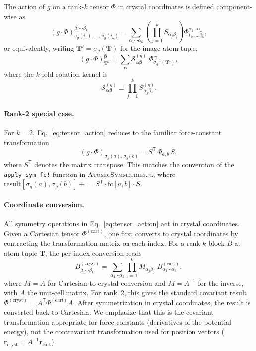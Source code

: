 \documentclass[twocolumn,amsmath,amssymb,aps,prb,10pt,floatfix]{revtex4-2}
\newcommand{\vT}{\mathbf{T}}
\newcommand{\valpha}{\boldsymbol{\alpha}}
\newcommand{\vbeta}{\boldsymbol{\beta}}
\begin{document}
The action of $g$ on a rank-$k$ tensor $\Phi$ in crystal coordinates is defined component-wise as
\begin{equation}
(g \cdot \Phi)^{\beta_1 \cdots \beta_k}_{\sigma_g(i_1),\, \dots,\, \sigma_g(i_k)}
= \sum_{\alpha_1 \cdots \alpha_k}
  \left( \prod_{j=1}^{k} S_{\alpha_j \beta_j} \right)
  \Phi^{\alpha_1 \cdots \alpha_k}_{i_1, \dots, i_k},
\label{eq:tensor_action}
\end{equation}
or equivalently, writing $\vT' = \sigma_g(\vT)$ for the image atom tuple,
\begin{equation}
(g \cdot \Phi)^{\vbeta}_{\vT'}
= \sum_{\valpha} \mathcal{S}^{(g)}_{\valpha \vbeta}\;
  \Phi^{\valpha}_{\sigma_g^{-1}(\vT')},
\label{eq:tensor_action_compact}
\end{equation}
where the $k$-fold rotation kernel is
\begin{equation}
\mathcal{S}^{(g)}_{\valpha \vbeta}
\equiv \prod_{j=1}^{k} S^{(g)}_{\alpha_j \beta_j}.
\label{eq:rotation_kernel}
\end{equation}

\paragraph{Rank-2 special case.}
For $k=2$, Eq.~\eqref{eq:tensor_action} reduces to the familiar force-constant transformation~\cite{Maradudin1968,BornHuang1954}
\begin{equation}
(g \cdot \Phi)_{\sigma_g(a),\, \sigma_g(b)}
= S^{\mathsf{T}} \, \Phi_{a,b} \, S,
\label{eq:rank2_action}
\end{equation}
where $S^{\mathsf{T}}$ denotes the matrix transpose.
This matches the convention of the \texttt{apply\_sym\_fc!} function in \textsc{AtomicSymmetries.jl}, where
$\text{result}[\sigma_g(a), \sigma_g(b)] \mathrel{+}= S^{\mathsf{T}} \cdot \text{fc}[a,b] \cdot S$.

\paragraph{Coordinate conversion.}
All symmetry operations in Eq.~\eqref{eq:tensor_action} act in crystal coordinates.
Given a Cartesian tensor $\Phi^{(\mathrm{cart})}$, one first converts to crystal coordinates by contracting the transformation matrix on each index.
For a rank-$k$ block $B$ at atom tuple $\vT$, the per-index conversion reads
\begin{equation}
B^{(\mathrm{cryst})}_{\beta_1 \cdots \beta_k}
= \sum_{\alpha_1 \cdots \alpha_k}
\prod_{j=1}^{k} M_{\alpha_j \beta_j}\;
B^{(\mathrm{cart})}_{\alpha_1 \cdots \alpha_k},
\label{eq:coord_conversion}
\end{equation}
where $M = A$ for Cartesian-to-crystal conversion and $M = A^{-1}$ for the inverse, with $A$ the unit-cell matrix.
For rank~2, this gives the standard covariant result $\Phi^{(\mathrm{cryst})} = A^{\mathsf{T}} \Phi^{(\mathrm{cart})} A$.
After symmetrization in crystal coordinates, the result is converted back to Cartesian.
We emphasize that this is the covariant transformation appropriate for force constants (derivatives of the potential energy), not the contravariant transformation used for position vectors ($\mathbf{r}_{\mathrm{cryst}} = A^{-1} \mathbf{r}_{\mathrm{cart}}$).
\end{document}
